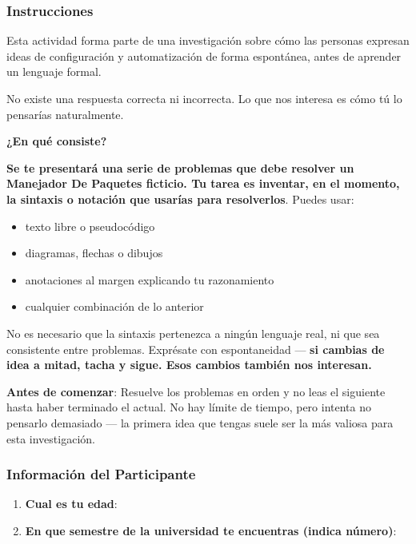 \subsubsection{Instrucciones}

Esta actividad forma parte de una investigación sobre cómo las personas expresan ideas de configuración y automatización de forma espontánea, antes de aprender un lenguaje formal.

No existe una respuesta correcta ni incorrecta. Lo que nos interesa es cómo tú lo pensarías naturalmente.

\textbf{¿En qué consiste?}

\textbf{Se te presentará una serie de problemas que debe resolver un Manejador De Paquetes ficticio. Tu tarea es inventar, en el momento, la sintaxis o notación que usarías para resolverlos}. Puedes usar:

\begin{itemize}
\item texto libre o pseudocódigo
\item diagramas, flechas o dibujos
\item anotaciones al margen explicando tu razonamiento
\item cualquier combinación de lo anterior
\end{itemize}

No es necesario que la sintaxis pertenezca a ningún lenguaje real, ni que sea consistente entre problemas. Exprésate con espontaneidad --- \textbf{si cambias de idea a mitad, tacha y sigue. Esos cambios también nos interesan.}

\textbf{Antes de comenzar}: Resuelve los problemas en orden y no leas el siguiente hasta haber terminado el actual. No hay límite de tiempo, pero intenta no pensarlo demasiado --- la primera idea que tengas suele ser la más valiosa para esta investigación.

\subsubsection{Información del Participante}

\begin{enumerate}
\item \textbf{Cual es tu edad}: \textunderscore{}\textunderscore{}\textunderscore{}\textunderscore{}\textunderscore{}\textunderscore{}\textunderscore{}\textunderscore{}\textunderscore{}\textunderscore{}\textunderscore{}\textunderscore{}\textunderscore{}\textunderscore{}\textunderscore{}\textunderscore{}\textunderscore{}\textunderscore{}\textunderscore{}\textunderscore{}\textunderscore{}\textunderscore{}\textunderscore{}\textunderscore{}\textunderscore{}
\item \textbf{En que semestre de la universidad te encuentras (indica número)}: \textunderscore{}\textunderscore{}\textunderscore{}\textunderscore{}
\end{enumerate}

